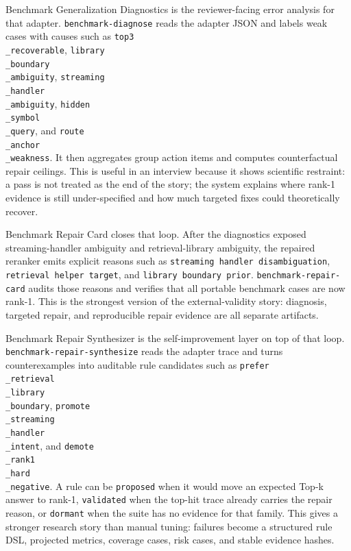 \documentclass[UTF8,12pt,openany]{ctexbook}
\begin{document}
Benchmark Generalization Diagnostics is the reviewer-facing error analysis for that adapter. \texttt{benchmark-diagnose} reads the adapter JSON and labels weak cases with causes such as \texttt{top3\\_recoverable}, \texttt{library\\_boundary\\_ambiguity}, \texttt{streaming\\_handler\\_ambiguity}, \texttt{hidden\\_symbol\\_query}, and \texttt{route\\_anchor\\_weakness}. It then aggregates group action items and computes counterfactual repair ceilings. This is useful in an interview because it shows scientific restraint: a pass is not treated as the end of the story; the system explains where rank-1 evidence is still under-specified and how much targeted fixes could theoretically recover.\par

Benchmark Repair Card closes that loop. After the diagnostics exposed streaming-handler ambiguity and retrieval-library ambiguity, the repaired reranker emits explicit reasons such as \texttt{streaming handler disambiguation}, \texttt{retrieval helper target}, and \texttt{library boundary prior}. \texttt{benchmark-repair-card} audits those reasons and verifies that all portable benchmark cases are now rank-1. This is the strongest version of the external-validity story: diagnosis, targeted repair, and reproducible repair evidence are all separate artifacts.\par

Benchmark Repair Synthesizer is the self-improvement layer on top of that loop. \texttt{benchmark-repair-synthesize} reads the adapter trace and turns counterexamples into auditable rule candidates such as \texttt{prefer\\_retrieval\\_library\\_boundary}, \texttt{promote\\_streaming\\_handler\\_intent}, and \texttt{demote\\_rank1\\_hard\\_negative}. A rule can be \texttt{proposed} when it would move an expected Top-k answer to rank-1, \texttt{validated} when the top-hit trace already carries the repair reason, or \texttt{dormant} when the suite has no evidence for that family. This gives a stronger research story than manual tuning: failures become a structured rule DSL, projected metrics, coverage cases, risk cases, and stable evidence hashes.\par
\end{document}
